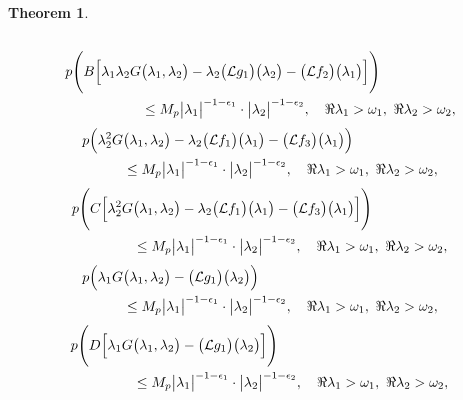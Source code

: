 \documentclass{amsart}
\newtheorem{thm}{Theorem}[section]
\theoremstyle{definition}
\theoremstyle{remark}
\numberwithin{equation}{section}
\begin{document}
\begin{thm}
\begin{itemize}
\begin{align}
\end{align}
\begin{align}\notag 
p\Biggl( B\Bigl[ \lambda_{1}\lambda_{2} G& \bigl(\lambda_{1},\lambda_{2}\bigr)-\lambda_{2}\bigl({\mathcal L} g_{1}\bigr)\bigl( \lambda_{2} \bigr)-\bigl({\mathcal L} f_{2}\bigr)\bigl( \lambda_{1} \bigr)\Bigr]\Biggr) 
\\\label{ok21}& \leq M_{p}  \bigl| \lambda_{1}\bigr|^{-1-\epsilon_{1}} \cdot \bigl| \lambda_{2}\bigr|^{-1-\epsilon_{2}} , \quad \Re \lambda_{1} >\omega_{1},\ \Re \lambda_{2}>\omega_{2},
\end{align}
\begin{align}\notag 
p\Bigl( \lambda_{2}^{2} G& \bigl(\lambda_{1},\lambda_{2}\bigr)-\lambda_{2}\bigl({\mathcal L} f_{1}\bigr)\bigl( \lambda_{1} \bigr)-\bigl({\mathcal L} f_{3}\bigr)\bigl( \lambda_{1} \bigr)\Bigr) 
\\\label{ok3}& \leq M_{p}  \bigl| \lambda_{1}\bigr|^{-1-\epsilon_{1}} \cdot \bigl| \lambda_{2}\bigr|^{-1-\epsilon_{2}} , \quad \Re \lambda_{1} >\omega_{1},\ \Re \lambda_{2}>\omega_{2},
\end{align}
\begin{align}\notag 
p\Biggl( C\Bigl[\lambda_{2}^{2} G& \bigl(\lambda_{1},\lambda_{2}\bigr)-\lambda_{2}\bigl({\mathcal L} f_{1}\bigr)\bigl( \lambda_{1} \bigr)-\bigl({\mathcal L} f_{3}\bigr)\bigl( \lambda_{1} \bigr)\Bigr]\Biggr) 
\\\label{ok31}& \leq M_{p}  \bigl| \lambda_{1}\bigr|^{-1-\epsilon_{1}} \cdot \bigl| \lambda_{2}\bigr|^{-1-\epsilon_{2}} , \quad \Re \lambda_{1} >\omega_{1},\ \Re \lambda_{2}>\omega_{2},
\end{align}
\begin{align}\notag 
p\Bigl( \lambda_{1}G& \bigl(\lambda_{1},\lambda_{2}\bigr)-\bigl({\mathcal L}g_{1} \bigr)\bigl( \lambda_{2} \bigr)  \Bigr)
\\\label{ok4}&  \leq M_{p}  \bigl| \lambda_{1}\bigr|^{-1-\epsilon_{1}} \cdot \bigl| \lambda_{2}\bigr|^{-1-\epsilon_{2}} , \quad \Re \lambda_{1} >\omega_{1},\ \Re \lambda_{2}>\omega_{2},
\end{align}
\begin{align}
p\Biggl( D\Bigl[\lambda_{1}G&\bigl(\lambda_{1},\lambda_{2}\bigr)-\bigl({\mathcal L}g_{1} \bigr)\bigl( \lambda_{2} \bigr)  \Bigr]\Biggr) \\\label{ok41} & \leq M_{p}  \bigl| \lambda_{1}\bigr|^{-1-\epsilon_{1}} \cdot \bigl| \lambda_{2}\bigr|^{-1-\epsilon_{2}} , \quad \Re \lambda_{1} >\omega_{1},\ \Re \lambda_{2}>\omega_{2},
\end{align}

\end{itemize}
\end{thm}
\end{document}
